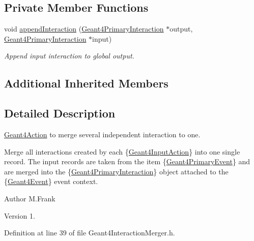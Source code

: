 \subsection*{Private Member Functions}
\begin{DoxyCompactItemize}
\item 
void \hyperlink{class_d_d4hep_1_1_simulation_1_1_geant4_interaction_merger_a224d85d05dcd541ef4185e0a91ade714}{append\+Interaction} (\hyperlink{class_d_d4hep_1_1_simulation_1_1_geant4_primary_interaction}{Geant4\+Primary\+Interaction} $\ast$output, \hyperlink{class_d_d4hep_1_1_simulation_1_1_geant4_primary_interaction}{Geant4\+Primary\+Interaction} $\ast$input)
\begin{DoxyCompactList}\small\item\em Append input interaction to global output. \end{DoxyCompactList}\end{DoxyCompactItemize}
\subsection*{Additional Inherited Members}


\subsection{Detailed Description}
\hyperlink{class_d_d4hep_1_1_simulation_1_1_geant4_action}{Geant4\+Action} to merge several independent interaction to one. 

Merge all interactions created by each \{\hyperlink{class_d_d4hep_1_1_simulation_1_1_geant4_input_action}{Geant4\+Input\+Action}\} into one single record. The input records are taken from the item \{\hyperlink{class_d_d4hep_1_1_simulation_1_1_geant4_primary_event}{Geant4\+Primary\+Event}\} and are merged into the \{\hyperlink{class_d_d4hep_1_1_simulation_1_1_geant4_primary_interaction}{Geant4\+Primary\+Interaction}\} object attached to the \{\hyperlink{class_d_d4hep_1_1_simulation_1_1_geant4_event}{Geant4\+Event}\} event context.

\begin{DoxyAuthor}{Author}
M.\+Frank 
\end{DoxyAuthor}
\begin{DoxyVersion}{Version}
1. 
\end{DoxyVersion}


Definition at line 39 of file Geant4\+Interaction\+Merger.\+h.



